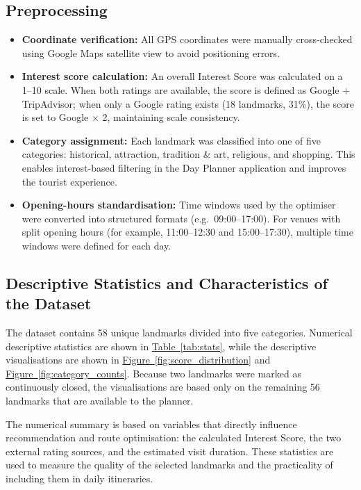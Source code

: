 \subsection*{Preprocessing}

\begin{itemize}
  \item \textbf{Coordinate verification:} All GPS coordinates were manually cross-checked
        using Google Maps satellite view to avoid positioning errors.

  \item \textbf{Interest score calculation:} An overall Interest Score was calculated on a
        1--10 scale. When both ratings are available, the score is defined as Google +
        TripAdvisor; when only a Google rating exists (18 landmarks, 31\%), the score is
        set to Google $\times$ 2, maintaining scale consistency.

  \item \textbf{Category assignment:} Each landmark was classified into one of five
        categories: historical, attraction, tradition \& art, religious, and shopping. This
        enables interest-based filtering in the Day Planner application and improves the
        tourist experience.

  \item \textbf{Opening-hours standardisation:} Time windows used by the optimiser were
        converted into structured formats (e.g.\ 09:00--17:00). For venues with split
        opening hours (for example, 11:00--12:30 and 15:00--17:30), multiple time windows
        were defined for each day.
\end{itemize}

\subsection*{Descriptive Statistics and Characteristics of the Dataset}

The dataset contains 58 unique landmarks divided into five categories. Numerical descriptive statistics are shown in \hyperref[tab:stats]{Table~\ref*{tab:stats}}, while the descriptive visualisations are shown in \hyperref[fig:score_distribution]{Figure~\ref*{fig:score_distribution}} and \hyperref[fig:category_counts]{Figure~\ref*{fig:category_counts}}. Because two landmarks were marked as continuously closed, the visualisations are based only on the remaining 56 landmarks that are available to the planner.

The numerical summary is based on variables that directly influence recommendation and
route optimisation: the calculated Interest Score, the two external rating sources, and the
estimated visit duration. These statistics are used to measure the quality of the selected
landmarks and the practicality of including them in daily itineraries.

